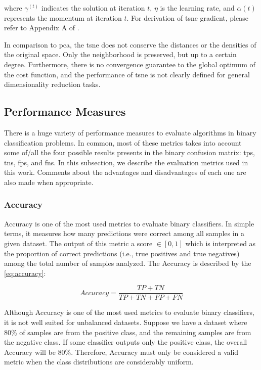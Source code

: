 \noindent
where $\gamma^{(t)}$ indicates the solution at iteration $t$, $\eta$ is the learning rate, and $\alpha(t)$ represents the momentum at iteration $t$. For derivation of \acs{tsne} gradient, please refer to Appendix A of \citep{tsne}. 

In comparison to \acs{pca}, the \acs{tsne} does not conserve the distances or the densities of the original space. Only the neighborhood is preserved, but up to a certain degree. Furthermore, there is no convergence guarantee to the global optimum of the cost function, and the performance of \acs{tsne} is not clearly defined for general dimensionality reduction tasks. 


\subsection{Performance Measures} \label{sec:measures}

There is a huge variety of performance measures to evaluate algorithms in binary classification problems. In common, most of these metrics takes into account some of/all the four possible results presents in the binary confusion matrix: \acfp{tp}, \acfp{tn}, \acfp{fp}, and \acfp{fn}. In this subsection, we describe the evaluation metrics used in this work. Comments about the advantages and disadvantages of each one are also made when appropriate. 

\subsubsection{Accuracy}

Accuracy is one of the most used metrics to evaluate binary classifiers. In simple terms, it measures how many predictions were correct among all samples in a given dataset. The output of this metric a score $\in [0, 1]$ which is interpreted as the proportion of correct predictions (i.e., true positives and true negatives) among the total number of samples analyzed. The Accuracy is described by the \autoref{eq:accuracy}:

\begin{equation}
\label{eq:accuracy}
Accuracy = \frac{TP + TN}{TP + TN + FP + FN}
\end{equation}

Although Accuracy is one of the most used metrics to evaluate binary classifiers, it is not well suited for unbalanced datasets. Suppose we have a dataset where 80\% of samples are from the positive class, and the remaining samples are from the negative class. If some classifier outputs only the positive class, the overall Accuracy will be 80\%. Therefore, Accuracy must only be considered a valid metric when the class distributions are considerably uniform.

